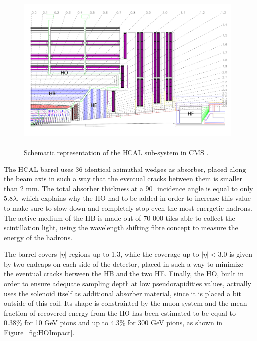 \documentclass[a4paper, 10pt, openright]{report}
\begin{document}
\begin{figure}[htbp]
\begin{center}
\includegraphics[width=11cm, height=8cm]{figs/CMSHCAL.png}
\caption{Schematic representation of the \ac{HCAL} sub-system in \ac{CMS} \cite{CMSDescription}.}
\label{fig:CMSHCAL}
\end{center}
\end{figure}

The \ac{HCAL} barrel uses 36 identical azimuthal wedges as absorber, placed along the beam axis in such a way that the eventual cracks between them is smaller than 2 mm. The total absorber thickness at a $90^{\circ}$ incidence angle is equal to only $5.8 \lambda$, which explains why the \ac{HO} had to be added in order to increase this value to make sure to slow down and completely stop even the most energetic hadrons. The active medium of the HB is made out of 70 000 tiles able to collect the scintillation light, using the wavelength shifting fibre concept to measure the energy of the hadrons. 

The barrel covers $|\eta|$ regions up to 1.3, while the coverage up to $|\eta| < 3.0$ is given by two endcaps on each side of the detector, placed in such a way to minimize the eventual cracks between the HB and the two HE. Finally, the \ac{HO}, built in order to ensure adequate sampling depth at low pseudorapidities values, actually uses the solenoid itself as additional absorber material, since it is placed a bit outside of this coil. Its shape is constrainted by the muon system and the mean fraction of recovered energy from the \ac{HO} has been estimated to be equal to 0.38\% for 10 GeV pions and up to 4.3\% for 300 GeV pions, as shown in Figure~\ref{fig:HOImpact}.
\end{document}
